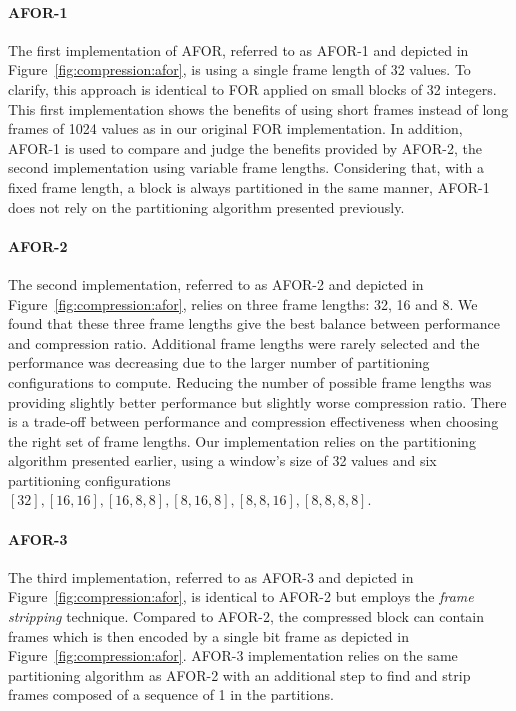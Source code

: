 \paragraph{AFOR-1}

The first implementation of AFOR, referred to as AFOR-1 and depicted in
Figure~\ref{fig:compression:afor}, is using a single frame length of 32
values. To clarify, this approach is identical to FOR applied on small blocks
of 32 integers. This first implementation shows the benefits of using short
frames instead of long frames of 1024 values as in our original FOR
implementation. In addition, AFOR-1 is used to compare and judge the benefits
provided by AFOR-2, the second implementation using variable frame lengths.
Considering that, with a fixed frame length, a block is always partitioned in
the same manner, AFOR-1 does not rely on the partitioning algorithm presented
previously.

\paragraph{AFOR-2}

The second implementation, referred to as AFOR-2 and depicted in
Figure~\ref{fig:compression:afor}, relies on three frame lengths: 32, 16 and
8. We found that these three frame lengths give the best balance between
performance and compression ratio. Additional frame lengths were rarely
selected and the performance was decreasing due to the larger number of
partitioning configurations to compute. Reducing the number of possible frame
lengths was providing slightly better performance but slightly worse
compression ratio. There is a trade-off between performance and compression
effectiveness when choosing the right set of frame lengths. Our implementation
relies on the partitioning algorithm presented earlier, using a window's size
of 32 values and six partitioning configurations
$[32],[16,16],[16,8,8],[8,16,8],[8,8,16],[8,8,8,8]$.

\paragraph{AFOR-3}

The third implementation, referred to as AFOR-3 and depicted in
Figure~\ref{fig:compression:afor}, is identical to AFOR-2 but employs the
\emph{frame stripping} technique. Compared to AFOR-2, the compressed block can
contain frames which is then encoded by a single bit frame as depicted in
Figure~\ref{fig:compression:afor}. AFOR-3 implementation relies on the same
partitioning algorithm as AFOR-2 with an additional step to find and strip
frames composed of a sequence of 1 in the partitions.

